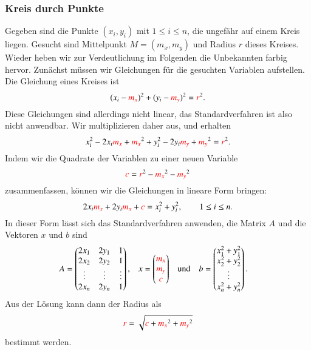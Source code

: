 \subsubsection{Kreis durch Punkte}
Gegeben sind die Punkte $(x_i,y_i)$ mit $1\le i\le n$, die ungefähr
auf einem Kreis liegen.
Gesucht sind Mittelpunkt $M=(m_x,m_y)$ und Radius $r$ dieses Kreises.
Wieder heben wir zur Verdeutlichung im Folgenden die Unbekannten farbig
hervor.
Zunächst müssen wir Gleichungen für die gesuchten Variablen aufstellen.
Die Gleichung eines Kreises ist
\[
(x_i - {\color{red}m_x})^2 + (y_i - {\color{red}m_y})^2 = {\color{red}r}^2.
\]
Diese Gleichungen sind allerdings nicht linear, das Standardverfahren 
ist also nicht anwendbar.
Wir multiplizieren daher aus, und erhalten
\[
x_i^2 - 2x_i {\color{red}m_x} + {\color{red}m_x}^2
+
y_i^2 - 2y_i {\color{red}m_y} + {\color{red}m_y}^2
=
{\color{red}r}^2.
\]
Indem wir die Quadrate der Variablen zu einer neuen Variable 
\[
{\color{red}c}
=
{\color{red}r}^2
-
{\color{red}m_x}^2
-
{\color{red}m_y}^2
\]
zusammenfassen, können wir die Gleichungen in lineare Form bringen:
\begin{equation}
2x_i{\color{red}m_x}
+
2y_i{\color{red}m_x}
+
{\color{red}c}
=
x_i^2+y_i^2,\qquad 1\le i\le n.
\end{equation}
In dieser Form lässt sich das Standardverfahren anwenden, die Matrix
$A$ und die Vektoren $x$ und $b$ sind
\begin{align*}
A
&=
\begin{pmatrix}
2x_1  & 2y_1 & 1    \\
2x_2  & 2y_2 & 1    \\
\vdots&\vdots&\vdots\\
2x_n  & 2y_n & 1    \\
\end{pmatrix},
&
x&=\begin{pmatrix}
{\color{red}m_x}\\
{\color{red}m_y}\\
{\color{red}c}
\end{pmatrix}
&&\text{und}&
b
&=
\begin{pmatrix}
x_1^2+y_1^2\\
x_2^2+y_2^2\\
\vdots\\
x_n^2+y_n^2
\end{pmatrix}.
\end{align*}
Aus der Lösung kann dann der Radius als 
\[
{\color{red}r}= 
\sqrt{
{\color{red}c}
+
{\color{red}m_x}^2
+
{\color{red}m_y}^2
}
\]
bestimmt werden.

